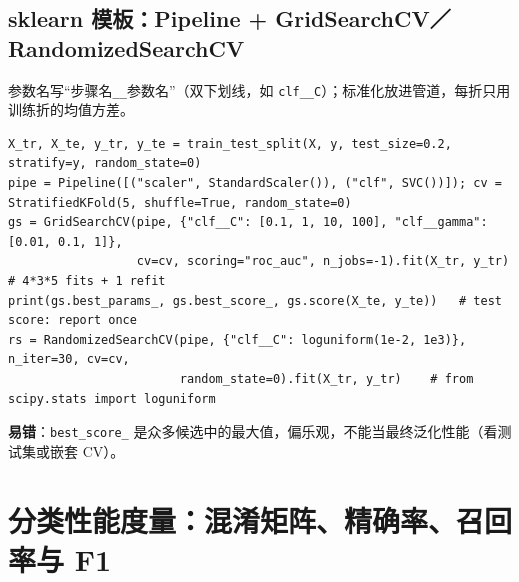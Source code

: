 \subsection{sklearn 模板：Pipeline + GridSearchCV／RandomizedSearchCV}
参数名写“步骤名\texttt{\_\_}参数名”（双下划线，如 \texttt{clf\_\_C}）；标准化放进管道，每折只用训练折的均值方差。
\begin{lstlisting}[basicstyle=\ttfamily\footnotesize]
X_tr, X_te, y_tr, y_te = train_test_split(X, y, test_size=0.2, stratify=y, random_state=0)
pipe = Pipeline([("scaler", StandardScaler()), ("clf", SVC())]); cv = StratifiedKFold(5, shuffle=True, random_state=0)
gs = GridSearchCV(pipe, {"clf__C": [0.1, 1, 10, 100], "clf__gamma": [0.01, 0.1, 1]},
                  cv=cv, scoring="roc_auc", n_jobs=-1).fit(X_tr, y_tr)        # 4*3*5 fits + 1 refit
print(gs.best_params_, gs.best_score_, gs.score(X_te, y_te))   # test score: report once
rs = RandomizedSearchCV(pipe, {"clf__C": loguniform(1e-2, 1e3)}, n_iter=30, cv=cv,
                        random_state=0).fit(X_tr, y_tr)    # from scipy.stats import loguniform
\end{lstlisting}
\noindent\textbf{易错}：\texttt{best\_score\_} 是众多候选中的最大值，偏乐观，不能当最终泛化性能（看测试集或嵌套 CV）。

\section{分类性能度量：混淆矩阵、精确率、召回率与 F1}

